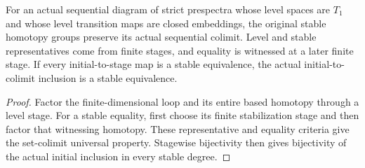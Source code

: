 \begin{proposition}
  \label{prop:actual-stable-homotopy-sequential-colimits}
  \leanok
  For an actual sequential diagram of strict prespectra whose level spaces are $T_1$ and whose level transition maps are closed embeddings, the original stable homotopy groups preserve its actual sequential colimit. Level and stable representatives come from finite stages, and equality is witnessed at a later finite stage. If every initial-to-stage map is a stable equivalence, the actual initial-to-colimit inclusion is a stable equivalence.
\end{proposition}
\begin{proof}
  Factor the finite-dimensional loop and its entire based homotopy through a level stage. For a stable equality, first choose its finite stabilization stage and then factor that witnessing homotopy. These representative and equality criteria give the set-colimit universal property. Stagewise bijectivity then gives bijectivity of the actual initial inclusion in every stable degree.
  \leanok
\end{proof}

